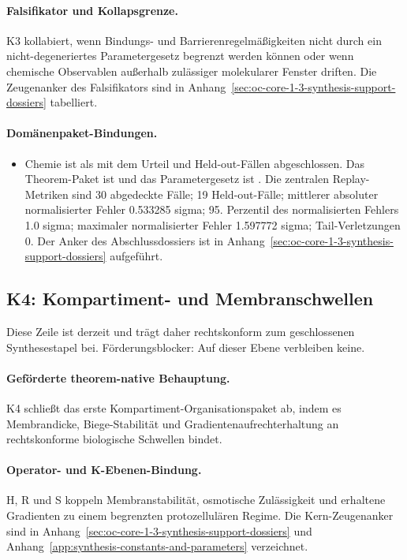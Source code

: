 \paragraph{Falsifikator und Kollapsgrenze.}
K3 kollabiert, wenn Bindungs- und Barrierenregelmäßigkeiten nicht durch ein nicht-degeneriertes Parametergesetz begrenzt werden können oder wenn chemische Observablen außerhalb zulässiger molekularer Fenster driften.
Die Zeugenanker des Falsifikators sind in Anhang~\ref{sec:oc-core-1-3-synthesis-support-dossiers} tabelliert.

\paragraph{Domänenpaket-Bindungen.}
\begin{itemize}[leftmargin=1.6em,nosep]
\item Chemie ist als  mit dem Urteil  und  Held-out-Fällen abgeschlossen. Das Theorem-Paket ist  und das Parametergesetz ist . Die zentralen Replay-Metriken sind 30 abgedeckte Fälle; 19 Held-out-Fälle; mittlerer absoluter normalisierter Fehler 0.533285 sigma; 95. Perzentil des normalisierten Fehlers 1.0 sigma; maximaler normalisierter Fehler 1.597772 sigma; Tail-Verletzungen 0. Der Anker des Abschlussdossiers ist in Anhang~\ref{sec:oc-core-1-3-synthesis-support-dossiers} aufgeführt.
\end{itemize}

\subsection{K4: Kompartiment- und Membranschwellen}
\label{sec:oc-core-1-3-synthesis-k4}
Diese Zeile ist derzeit  und trägt daher rechtskonform zum geschlossenen Synthesestapel bei.
Förderungsblocker: Auf dieser Ebene verbleiben keine.

\paragraph{Geförderte theorem-native Behauptung.}
K4 schließt das erste Kompartiment-Organisationspaket ab, indem es Membrandicke, Biege-Stabilität und Gradientenaufrechterhaltung an rechtskonforme biologische Schwellen bindet.

\paragraph{Operator- und K-Ebenen-Bindung.}
H, R und S koppeln Membranstabilität, osmotische Zulässigkeit und erhaltene Gradienten zu einem begrenzten protozellulären Regime.
Die Kern-Zeugenanker sind in Anhang~\ref{sec:oc-core-1-3-synthesis-support-dossiers} und Anhang~\ref{app:synthesis-constants-and-parameters} verzeichnet.

